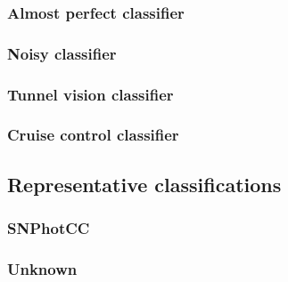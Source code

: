 \subsubsection{Almost perfect classifier}
\label{sec:almost}

\subsubsection{Noisy classifier}
\label{sec:noisy}

\subsubsection{Tunnel vision classifier}
\label{sec:tunnel}

\subsubsection{Cruise control classifier}
\label{sec:cruise}

\subsubsection{}
\label{sec:subsume}

\subsection{Representative classifications}
\label{sec:realdata}

\subsubsection{SNPhotCC}
\label{sec:snphotcc}

\subsubsection{Unknown}
\label{sec:mystery}
